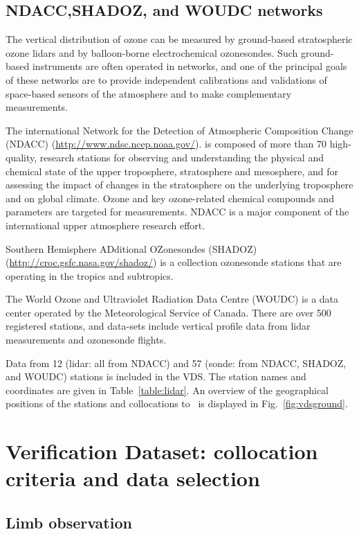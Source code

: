 \subsection{NDACC,SHADOZ, and WOUDC networks}


The vertical distribution of ozone can be measured by ground-based stratospheric 
ozone lidars and by balloon-borne electrochemical ozonesondes.
Such ground-based instruments are often operated in networks,
and one of the principal goals of these networks are to provide
independent calibrations and validations of space-based sensors
of the atmosphere and to make complementary measurements.

The international Network for the Detection of Atmospheric Composition Change (NDACC) 
(\url{http://www.ndsc.ncep.noaa.gov/}).
is composed of more than 70 high-quality, research stations for observing 
and understanding the physical and chemical 
state of the upper troposphere, stratosphere and mesosphere, 
and for assessing the impact of changes in the 
stratosphere on the underlying troposphere and on global climate.
Ozone and key ozone-related chemical compounds and parameters 
are targeted for measurements. NDACC is a major
component of the international upper atmosphere research
effort. 

Southern Hemisphere ADditional OZonesondes (SHADOZ)
(\url{http://croc.gsfc.nasa.gov/shadoz/})
is a collection ozonesonde stations that are operating in the 
tropics and subtropics.

The World Ozone and Ultraviolet Radiation Data Centre (WOUDC)
is a data center operated by the Meteorological Service of Canada.
There are over 500 registered stations,
and  data-sets include vertical profile data from lidar 
measurements and ozonesonde flights.

Data from 12 (lidar: all from NDACC) and 57 (sonde: from NDACC, SHADOZ, and WOUDC) 
stations is included in the VDS.
The station names and coordinates are given in Table~\ref{table:lidar}.  
An overview of the geographical positions of the stations and
collocations to \smr\ is  displayed in Fig.~\ref{fig:vdsground}.




\section{Verification Dataset: collocation criteria and data selection}
\label{sec:vdsselection}
\subsection{Limb observation}

